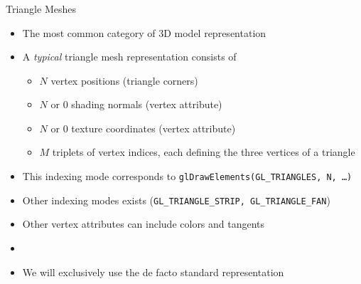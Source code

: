 \documentclass[utf8,stillsansserifmath,fleqn,t]{beamer}
\newcommand{\code}[1]{\texttt{#1}}
\begin{document}
\begin{frame}
\frametitle{\insertsection}
Triangle Meshes
\begin{itemize}
\item The most common category of 3D model representation
\item A \emph{typical} triangle mesh representation consists of
    \begin{itemize}
    \item $N$ vertex positions (triangle corners)
    \item $N$ or 0 shading normals (vertex attribute)
    \item $N$ or 0 texture coordinates (vertex attribute)
    \item $M$ triplets of vertex indices, each defining
    the three vertices of a triangle
    \end{itemize}
\item This indexing mode corresponds to \code{glDrawElements(GL\_TRIANGLES, N,
\ldots{})}
\item Other indexing modes exists (\code{GL\_TRIANGLE\_STRIP,
GL\_TRIANGLE\_FAN})
\item Other vertex attributes can include colors and tangents
\item[~]
\item We will exclusively use the de facto standard representation
\end{itemize}
\end{frame}
\end{document}
